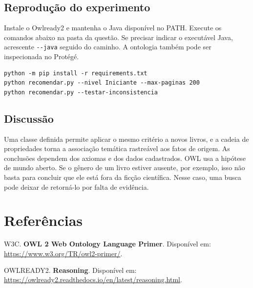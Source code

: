 \documentclass[12pt,a4paper]{article}
\begin{document}
\subsection{Reprodução do experimento}

Instale o Owlready2 e mantenha o Java disponível no PATH. Execute os comandos abaixo na pasta da questão. Se precisar indicar o executável Java, acrescente \texttt{-{}-java} seguido do caminho. A ontologia também pode ser inspecionada no Protégé.

\begin{lstlisting}
python -m pip install -r requirements.txt
python recomendar.py --nivel Iniciante --max-paginas 200
python recomendar.py --testar-inconsistencia
\end{lstlisting}

\subsection{Discussão}

Uma classe definida permite aplicar o mesmo critério a novos livros, e a cadeia de propriedades torna a associação temática rastreável aos fatos de origem. As conclusões dependem dos axiomas e dos dados cadastrados. OWL usa a hipótese de mundo aberto. Se o gênero de um livro estiver ausente, por exemplo, isso não basta para concluir que ele está fora da ficção científica. Nesse caso, uma busca pode deixar de retorná-lo por falta de evidência.

\section*{Referências}

\noindent [1] W3C. \textbf{OWL 2 Web Ontology Language Primer}. Disponível em: \url{https://www.w3.org/TR/owl2-primer/}.

\noindent [2] OWLREADY2. \textbf{Reasoning}. Disponível em: \url{https://owlready2.readthedocs.io/en/latest/reasoning.html}.
\end{document}
